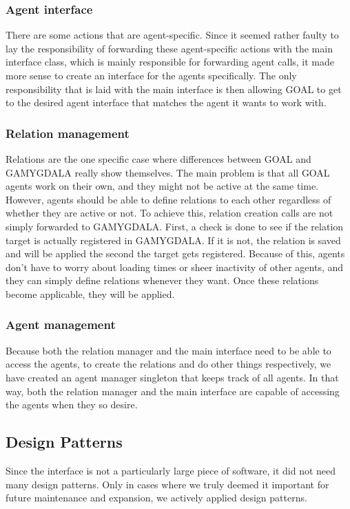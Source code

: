 \subsubsection{Agent interface}
There are some actions that are agent-specific. Since it seemed rather faulty to lay the responsibility of forwarding these agent-specific actions with the main interface class, which is mainly responsible for forwarding agent calls, it made more sense to create an interface for the agents specifically. The only responsibility that is laid with the main interface is then allowing GOAL to get to the desired agent interface that matches the agent it wants to work with.

\subsubsection{Relation management}
Relations are the one specific case where differences between GOAL and GAMYGDALA really show themselves. The main problem is that all GOAL agents work on their own, and they might not be active at the same time. However, agents should be able to define relations to each other regardless of whether they are active or not.
To achieve this, relation creation calls are not simply forwarded to GAMYGDALA. First, a check is done to see if the relation target is actually registered in GAMYGDALA. If it is not, the relation is saved and will be applied the second the target gets registered.
Because of this, agents don't have to worry about loading times or sheer inactivity of other agents, and they can simply define relations whenever they want. Once these relations become applicable, they will be applied.

\subsubsection{Agent management}
Because both the relation manager and the main interface need to be able to access the agents, to create the relations and do other things respectively, we have created an agent manager singleton that keeps track of all agents. In that way, both the relation manager and the main interface are capable of accessing the agents when they so desire.

\subsection{Design Patterns}
Since the interface is not a particularly large piece of software, it did not need many design patterns. Only in cases where we truly deemed it important for future maintenance and expansion, we actively applied design patterns.
